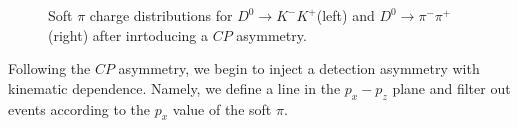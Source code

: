 \documentclass{article}
\begin{document}
    \begin{figure}[h!]
        \centering
        \caption{Soft $\pi$ charge distributions for $D^{0}\to K^-K^+$(left) and $D^{0}\to \pi^-\pi^+$(right) after inrtoducing a $CP$ asymmetry.}
    \end{figure}


    Following the $CP$ asymmetry, we begin to inject a detection asymmetry with kinematic dependence.
    Namely, we define a line in the $p_x - p_z$ plane and filter out events according to the $p_x$ value of the soft $\pi$.
\end{document}
